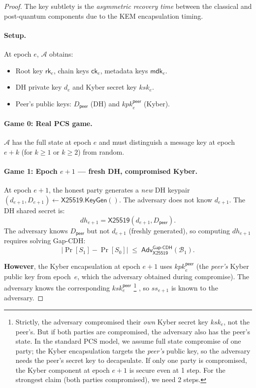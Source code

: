 \documentclass[11pt,a4paper]{article}
\theoremstyle{definition}
\theoremstyle{remark}
\newcommand{\adv}{\mathsf{Adv}}
\newcommand{\advA}{\mathcal{A}}
\newcommand{\advB}{\mathcal{B}}
\renewcommand{\DH}{\mathsf{X25519}}
\newcommand{\KeyGen}{\mathsf{KeyGen}}
\newcommand{\GapCDH}{\mathsf{Gap\text{-}CDH}}
\newcommand{\rk}{\mathsf{rk}}
\newcommand{\ck}{\mathsf{ck}}
\newcommand{\mdk}{\mathsf{mdk}}
\begin{document}
\begin{proof}
The key subtlety is the \emph{asymmetric recovery time} between the classical
and post-quantum components due to the KEM encapsulation timing.

\paragraph{Setup.} At epoch $e$, $\advA$ obtains:
\begin{itemize}[nosep]
  \item Root key $\rk_e$, chain keys $\ck_e$, metadata keys $\mdk_e$.
  \item DH private key $d_e$ and Kyber secret key $\mathit{ksk}_e$.
  \item Peer's public keys: $D_{\mathsf{peer}}$ (DH) and $\mathit{kpk}_e^{\mathsf{peer}}$ (Kyber).
\end{itemize}

\paragraph{Game 0: Real PCS game.} $\advA$ has the full state at epoch $e$
and must distinguish a message key at epoch $e + k$ (for $k \geq 1$ or $k \geq 2$)
from random.

\paragraph{Game 1: Epoch $e{+}1$ --- fresh DH, compromised Kyber.}
At epoch $e{+}1$, the honest party generates a \emph{new} DH keypair
$(d_{e+1}, D_{e+1}) \gets \DH.\KeyGen()$.  The adversary does not know $d_{e+1}$.
The DH shared secret is:
\[
  \mathit{dh}_{e+1} = \DH(d_{e+1}, D_{\mathsf{peer}}).
\]
The adversary knows $D_{\mathsf{peer}}$ but not $d_{e+1}$ (freshly generated),
so computing $\mathit{dh}_{e+1}$ requires solving Gap-CDH:
\[
  |\Pr[S_1] - \Pr[S_0]| \;\leq\; \adv^{\GapCDH}_{\DH}(\advB_1).
\]

\textbf{However}, the Kyber encapsulation at epoch $e{+}1$ uses
$\mathit{kpk}_e^{\mathsf{peer}}$ (the \emph{peer's} Kyber public key from
epoch~$e$, which the adversary obtained during compromise).  The adversary
knows the corresponding $\mathit{ksk}_e^{\mathsf{peer}}$%
\footnote{Strictly, the adversary compromised their \emph{own} Kyber secret key
$\mathit{ksk}_e$, not the peer's. But if both parties are compromised, the
adversary also has the peer's state. In the standard PCS model, we assume full
state compromise of one party; the Kyber encapsulation targets the
\emph{peer's} public key, so the adversary needs the peer's secret key to
decapsulate. If only one party is compromised, the Kyber component at epoch
$e{+}1$ is secure even at 1 step. For the strongest claim (both parties
compromised), we need 2 steps.}%
, so $\mathit{ss}_{e+1}$ is known to the adversary.


\end{proof}
\end{document}
